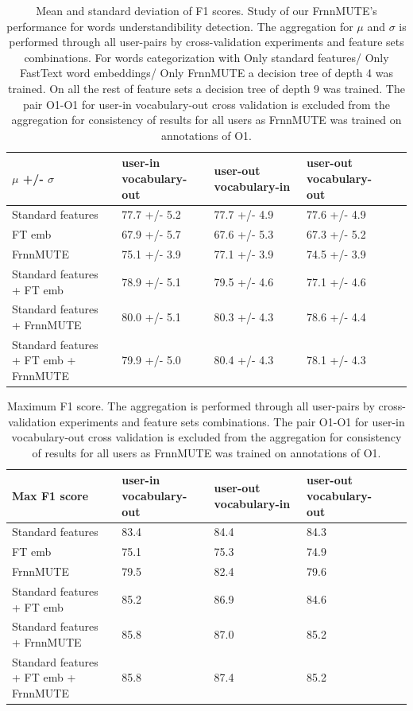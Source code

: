\begin{table}[h]
\centering
\begin{tabular}{L|MMMN}
\hline
$\mu$ +/- $\sigma$ & user-in vocabulary-out & user-out vocabulary-in & user-out vocabulary-out \\ \hline
Standard features & 77.7 +/- 5.2 & 77.7 +/- 4.9 & 77.6 +/- 4.9 \\[10pt]
FT emb & 67.9 +/- 5.7 & 67.6 +/- 5.3 & 67.3 +/- 5.2 \\[10pt]
FrnnMUTE & 75.1 +/- 3.9 & 77.1 +/- 3.9 & 74.5 +/- 3.9 \\[10pt]
Standard features + FT emb & 78.9 +/- 5.1 & 79.5 +/- 4.6 & 77.1 +/- 4.6 \\[10pt]
Standard features + FrnnMUTE & 80.0 +/- 5.1 & 80.3 +/- 4.3 & 78.6 +/- 4.4 \\[10pt]
Standard features + FT emb + FrnnMUTE & 79.9 +/- 5.0 & 80.4 +/- 4.3 & 78.1 +/- 4.3 \\ \hline
\end{tabular}
  \caption{Mean and standard deviation of F1 scores. Study of our FrnnMUTE's performance for words understandibility detection. The aggregation for $\mu$ and $\sigma$ is performed through all user-pairs by cross-validation experiments and feature sets combinations. For words categorization with Only standard features/ Only FastText word embeddings/ Only FrnnMUTE a decision tree of depth 4 was trained. On all the rest of feature sets a decision tree of depth 9 was trained. The pair O1-O1 for user-in vocabulary-out cross validation is excluded from the aggregation for consistency of results for all users as FrnnMUTE was trained on annotations of O1.}
  \label{tab:frnnmute}
\end{table}


\begin{table}[h]
\centering
\begin{tabular}{L|MMMN}
\hline
Max F1 score & user-in vocabulary-out & user-out vocabulary-in & user-out vocabulary-out \\ \hline
Standard features & 83.4\ & 84.4\ & 84.3\ \\[10pt]
FT emb  & 75.1\ & 75.3\ & 74.9\ \\[10pt]
FrnnMUTE & 79.5\ & 82.4\ & 79.6\ \\[10pt]
Standard features + FT emb & 85.2\ & 86.9\ & 84.6\ \\[10pt]
Standard features + FrnnMUTE & 85.8\ & 87.0\ & 85.2\ \\[10pt]
Standard features + FT emb + FrnnMUTE & 85.8\ & 87.4\ & 85.2\ \\ \hline
\end{tabular}
    \caption{Maximum F1 score. The aggregation is performed through all user-pairs by cross-validation experiments and feature sets combinations. The pair O1-O1 for user-in vocabulary-out cross validation is excluded from the aggregation for consistency of results for all users as FrnnMUTE was trained on annotations of O1.}
      \label{tab:frnnmute-max}
\end{table}


